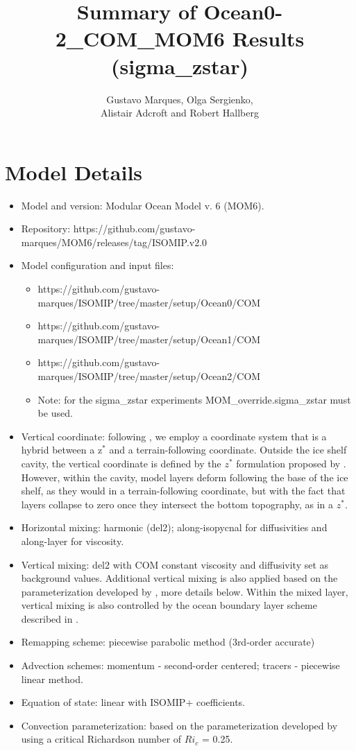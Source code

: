\documentclass[11pt]{article} %
\title{Summary of Ocean0-2\_COM\_MOM6 Results (sigma\_zstar)}
\author{Gustavo Marques,  Olga Sergienko, \\ Alistair Adcroft and Robert Hallberg}
\begin{document}
\maketitle

\section{Model Details}

\begin{itemize}
\item Model and version: Modular Ocean Model v. 6 (MOM6).
\item Repository: https://github.com/gustavo-marques/MOM6/releases/tag/ISOMIP.v2.0 
\item Model configuration and input files: 
\begin{itemize}
   \item https://github.com/gustavo-marques/ISOMIP/tree/master/setup/Ocean0/COM
   \item https://github.com/gustavo-marques/ISOMIP/tree/master/setup/Ocean1/COM
   \item https://github.com/gustavo-marques/ISOMIP/tree/master/setup/Ocean2/COM
   \item Note: for the sigma\_zstar experiments MOM\_override.sigma\_zstar must be used.
\end{itemize}
\item Vertical coordinate: following \cite{Stern2017}, we employ a coordinate system that is a hybrid between a z$^*$ and a terrain-following coordinate. Outside the ice shelf cavity, the vertical coordinate is defined by the $z^*$ formulation proposed by \cite{Adcroft2004}. However, within the cavity, model layers deform following the base of the ice shelf, as they would in a terrain-following coordinate, but with the fact that layers collapse to zero once they intersect the bottom topography, as in a $z^*$.
\item Horizontal mixing: harmonic (del2); along-isopycnal for diffusivities and along-layer for viscosity.
\item Vertical mixing: del2 with COM constant viscosity and diffusivity set as background values. Additional vertical mixing is also applied based on the parameterization developed by \cite{Jackson2008}, more details below. Within the mixed layer, vertical mixing is also controlled by the ocean boundary layer scheme described in \cite{Reichl2018}.
\item Remapping scheme: piecewise parabolic method (3rd-order accurate)
\item Advection schemes: momentum - second-order centered; tracers - piecewise linear method.
\item Equation of state: linear with ISOMIP+ coefficients.
\item Convection parameterization: based on the parameterization developed by \cite{Jackson2008} using a critical Richardson number of $Ri_c$ = 0.25.


\end{itemize}
\end{document}
